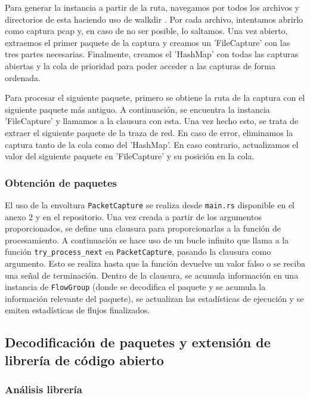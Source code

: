 Para generar la instancia a partir de la ruta, navegamos por todos los archivos y directorios de esta haciendo uso de walkdir \cite{walkdir}. Por cada archivo, intentamos abrirlo como captura pcap y, en caso de no ser posible, lo saltamos. Una vez abierto, extraemos el primer paquete de la captura y creamos un 'FileCapture' con las tres partes necesarias. Finalmente, creamos el 'HashMap' con todas las capturas abiertas y la cola de prioridad para poder acceder a las capturas de forma ordenada.

Para procesar el siguiente paquete, primero se obtiene la ruta de la captura con el siguiente paquete más antiguo. A continuación, se encuentra la instancia 'FileCapture' y llamamos a la clausura con esta. Una vez hecho esto, se trata de extraer el siguiente paquete de la traza de red. En caso de error, eliminamos la captura tanto de la cola como del 'HashMap'. En caso contrario, actualizamos el valor del siguiente paquete en 'FileCapture' y su posición en la cola.

\subsubsection{Obtención de paquetes} \label{obtencionpaquetes}

El uso de la envoltura \texttt{PacketCapture} se realiza desde \texttt{main.rs} disponible en el anexo 2 y en el repositorio. Una vez creada a partir de los argumentos proporcionados, se define una clausura para proporcionarlas a la función de procesamiento. A continuación se hace uso de un bucle infinito que llama a la función \texttt{try\_process\_next} en \texttt{PacketCapture}, pasando la clausura como argumento. Esto se realiza hasta que la función devuelve un valor falso o se reciba una señal de terminación. Dentro de la clausura, se acumula información en una instancia de \texttt{FlowGroup} (donde se decodifica el paquete y se acumula la información relevante del paquete), se actualizan las estadísticas de ejecución y se emiten estadísticas de flujos finalizados.

\subsection{Decodificación de paquetes y extensión de librería de código abierto} \label{packetdecode}

\subsubsection{Análisis librería}

